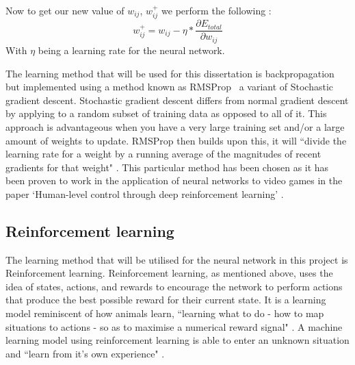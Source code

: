 \documentclass[10pt]{article}
\begin{document}
		Now to get our new value of $w_{ij}$, $w^+_{ij}$ we perform the following \cite{bpexample}:
		\begin{equation}
			w^+_{ij} = w_{ij} - \eta * \frac{\partial E_{total}}{\partial w_{ij}}
		\end{equation}
		With $\eta$ being a learning rate for the neural network.\\
		
		\medskip

		The learning method that will be used for this dissertation is backpropagation but implemented using a method known as RMSProp \cite{rms}\ a variant of Stochastic gradient descent. Stochastic gradient descent differs from normal gradient descent by applying to a random subset of training data as opposed to all of it. This approach is advantageous when you have a very large training set and/or a large amount of weights to update. RMSProp then builds upon this, it will ``divide the learning rate for a weight by a running average of the magnitudes of recent gradients for that weight" \cite{rms}. This particular method has been chosen as it has been proven to work in the application of neural networks to video games in the paper `Human-level control through deep reinforcement learning' \cite{humanlevel}.\\
	
	\medskip
	\subsection{Reinforcement learning}
		The learning method that will be utilised for the neural network in this project is Reinforcement learning. Reinforcement learning, as mentioned above, uses the idea of states, actions, and rewards to encourage the network to perform actions that produce the best possible reward for their current state. It is a learning model reminiscent of how animals learn, ``learning what to do - how to map situations to actions - so as to maximise a numerical reward signal" \cite{rlintro}. A machine learning model using reinforcement learning is able to enter an unknown situation and ``learn from it's own experience" \cite{rlintro}.\\
		
		\medskip
		
\end{document}
